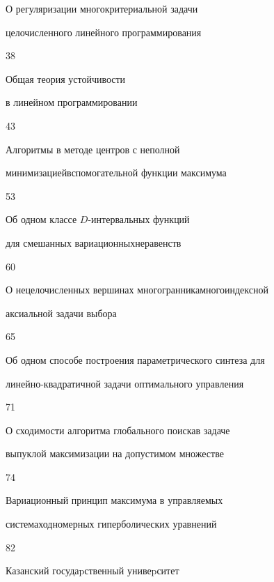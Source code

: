 {О регуляризации многокритериальной задачи\newline


целочисленного линейного программирования}{38}




{Общая теория устойчивости 


в линейном программировании}{43}




{Алгоритмы в методе центров с неполной


минимизацией\newline вспомогательной функции максимума}{53}




{Об одном классе $D$-интервальных функций 


для смешанных вариационных\newline неравенств}{60}




{О нецелочисленных вершинах многогранника\newline многоиндексной


аксиальной задачи выбора}{65}




{Об одном способе построения параметрического синтеза для\newline


линейно-квадратичной задачи оптимального управления}{71}




{О сходимости алгоритма глобального поиска\newline в задаче


выпуклой максимизации на допустимом множестве}{74}




{Вариационный принцип максимума в управляемых


системах\newline одномерных гиперболических уравнений}{82}








\vfill


\noindent\raisebox{2pt}{\copyright} Казанский госудаpственный унивеpситет





